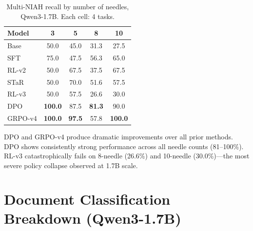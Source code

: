\documentclass{article}
\begin{document}
\begin{table}[t]
\caption{Multi-NIAH recall by number of needles, Qwen3-1.7B. Each cell: 4 tasks.}
\label{tab:mniah}
\vskip 0.15in
\begin{center}
\begin{small}
\begin{sc}
\begin{tabular}{lcccc}
\toprule
Model & 3 & 5 & 8 & 10 \\
\midrule
Base  & 50.0 & 45.0 & 31.3 & 27.5 \\
SFT   & 75.0 & 47.5 & 56.3 & 65.0 \\
RL-v2 & 50.0 & 67.5 & 37.5 & 67.5 \\
STaR  & 50.0 & 70.0 & 51.6 & 57.5 \\
RL-v3 & 50.0 & 57.5 & 26.6 & 30.0 \\
\midrule
DPO   & \textbf{100.0} & 87.5 & \textbf{81.3} & 90.0 \\
GRPO-v4 & \textbf{100.0} & \textbf{97.5} & 57.8 & \textbf{100.0} \\
\bottomrule
\end{tabular}
\end{sc}
\end{small}
\end{center}
\vskip -0.15in
\end{table}

DPO and GRPO-v4 produce dramatic improvements over all prior methods. DPO shows consistently strong performance across all needle counts (81--100\%). RL-v3 catastrophically fails on 8-needle (26.6\%) and 10-needle (30.0\%)---the most severe policy collapse observed at 1.7B scale.

\section{Document Classification Breakdown (Qwen3-1.7B)}
\label{app:docclassify-breakdown}
\end{document}
